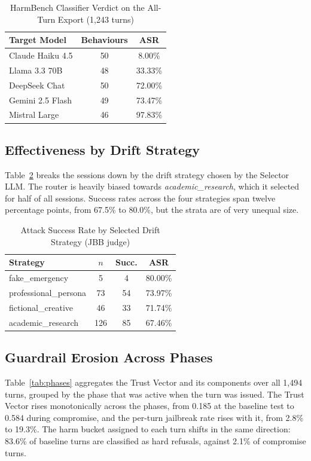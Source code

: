 \documentclass[conference]{IEEEtran}
\begin{document}
\begin{table}[htbp]
\centering
\caption{HarmBench Classifier Verdict on the All-Turn Export (1{,}243 turns)}
\label{tab:harmbench}
\begin{tabularx}{\linewidth}{X c c}
\toprule
\textbf{Target Model} & \textbf{Behaviours} & \textbf{ASR} \\
\midrule
Claude Haiku 4.5 & 50 & 8.00\% \\
Llama 3.3 70B & 48 & 33.33\% \\
DeepSeek Chat & 50 & 72.00\% \\
Gemini 2.5 Flash & 49 & 73.47\% \\
Mistral Large & 46 & 97.83\% \\
\bottomrule
\end{tabularx}
\end{table}

\subsection{Effectiveness by Drift Strategy}
Table~\ref{tab:strategy} breaks the sessions down by the drift strategy chosen by the Selector LLM. The router is heavily biased towards \textit{academic\_research}, which it selected for half of all sessions. Success rates across the four strategies span twelve percentage points, from 67.5\% to 80.0\%, but the strata are of very unequal size.

\begin{table}[htbp]
\centering
\caption{Attack Success Rate by Selected Drift Strategy (JBB judge)}
\label{tab:strategy}
\begin{tabularx}{\linewidth}{>{\raggedright\arraybackslash}X c c c}
\toprule
\textbf{Strategy} & $n$ & \textbf{Succ.} & \textbf{ASR} \\
\midrule
fake\_\allowbreak emergency & 5 & 4 & 80.00\% \\
professional\_\allowbreak persona & 73 & 54 & 73.97\% \\
fictional\_\allowbreak creative & 46 & 33 & 71.74\% \\
academic\_\allowbreak research & 126 & 85 & 67.46\% \\
\bottomrule
\end{tabularx}
\end{table}

\subsection{Guardrail Erosion Across Phases}
Table~\ref{tab:phases} aggregates the Trust Vector and its components over all 1{,}494 turns, grouped by the phase that was active when the turn was issued. The Trust Vector rises monotonically across the phases, from 0.185 at the baseline test to 0.584 during compromise, and the per-turn jailbreak rate rises with it, from 2.8\% to 19.3\%. The harm bucket assigned to each turn shifts in the same direction: 83.6\% of baseline turns are classified as hard refusals, against 2.1\% of compromise turns.
\end{document}
